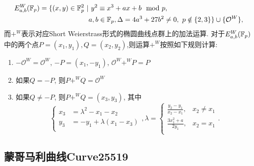 \begin{equation*}
\begin{split}
E_{a,b}^{W}(\mathbb{F}_p)= \{(x,y)\in \mathbb{F}_p^2\ | & \ y^2 \equiv x^3 + ax + b \mod p, \\
 & a, b \in \mathbb{F}_p, \Delta = 4a^3 + 27b^2 \neq 0, \ p \notin \{2,3\}\} \cup \{\mathcal{O}^W\},
\end{split}
\end{equation*}
而$+^W$表示对应Short Weierstrass形式的椭圆曲线点群上的加法运算.
对于$E_{a,b}^{W}(\mathbb{F}_p)$中的两个点$P=(x_1,y_1), Q = (x_2, y_2)$,则运算$+^W$按照如下规则计算:
\begin{enumerate}
\item $-\mathcal{O}^W = \mathcal{O}^W$, $-P = (x_ 1, -y_1)$, $\mathcal{O}^W +^W P = P$
\item 如果$Q = -P$, 则$P +^W Q=\mathcal{O}^W$
\item 如果$Q\neq -P$, 则$P +^W Q=(x_3,y_3)$, 其中
\begin{equation*}
\left\{
\begin{array}{ll}
x_3 &= \lambda^2 - x_1 - x_2 \\
y_3 & = -y_1 + \lambda(x_1-x_3) \\
\end{array},
\right.
\lambda = 
\left\{
\begin{array}{ll}
\frac{y_2-y_1}{x_2-x_1}, & x_2\neq x_1\\
\frac{3x_1^2+a}{2y_1}, & x_2 =  x_1\\
\end{array}.
\right.
\end{equation*}
\end{enumerate}


\subsection{蒙哥马利曲线Curve25519}

